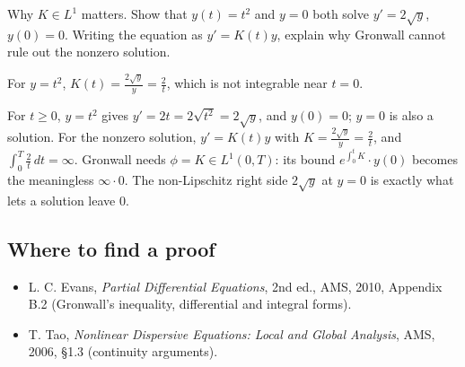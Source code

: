 \begin{exercise}
  Why $K \in L^1$ matters. Show that $y(t) = t^2$ and $y = 0$ both solve $y' = 2\sqrt{y}$, $y(0) = 0$. Writing the equation as $y' = K(t)y$, explain why Gronwall cannot rule out the nonzero solution.
  \begin{hint}
    For $y = t^2$, $K(t) = \frac{2\sqrt{y}}{y} = \frac{2}{t}$, which is not integrable near $t = 0$.
  \end{hint}
  \begin{solution}
    For $t \ge 0$, $y = t^2$ gives $y' = 2t = 2\sqrt{t^2} = 2\sqrt y$, and $y(0) = 0$; $y = 0$ is also a solution. For the nonzero solution, $y' = K(t)y$ with $K = \frac{2\sqrt y}{y} = \frac2t$, and $\int_0^T\frac2t\,dt = \infty$. Gronwall needs $\phi = K \in L^1(0,T)$: its bound $e^{\int_0^tK}\cdot y(0)$ becomes the meaningless $\infty\cdot 0$. The non-Lipschitz right side $2\sqrt y$ at $y = 0$ is exactly what lets a solution leave $0$.
  \end{solution}
\end{exercise}

\subsection*{Where to find a proof}

\begin{itemize}
\item L. C. Evans, \emph{Partial Differential Equations}, 2nd ed., AMS, 2010, Appendix B.2 (Gronwall's inequality, differential and integral forms).
\item T. Tao, \emph{Nonlinear Dispersive Equations: Local and Global Analysis}, AMS, 2006, §1.3 (continuity arguments).
\end{itemize}

\neededfor
